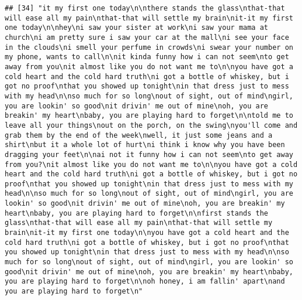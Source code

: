 \documentclass[]{article}
\begin{document}
\begin{verbatim}
## [34] "it my first one today\n\nthere stands the glass\nthat-that will ease all my pain\nthat-that will settle my brain\nit-it my first one today\n\nhey\ni saw your sister at work\ni saw your mama at church\ni am pretty sure i saw your car at the mall\ni see your face in the clouds\ni smell your perfume in crowds\ni swear your number on my phone, wants to call\n\nit kinda funny how i can not seem\nto get away from you\nit almost like you do not want me to\n\nyou have got a cold heart and the cold hard truth\ni got a bottle of whiskey, but i got no proof\nthat you showed up tonight\nin that dress just to mess with my head\n\nso much for so long\nout of sight, out of mind\ngirl, you are lookin' so good\nit drivin' me out of mine\noh, you are breakin' my heart\nbaby, you are playing hard to forget\n\ntold me to leave all your things\nout on the porch, on the swing\nyou'll come and grab them by the end of the week\nwell, it just some jeans and a shirt\nbut it a whole lot of hurt\ni think i know why you have been dragging your feet\n\nai not it funny how i can not seem\nto get away from you?\nit almost like you do not want me to\n\nyou have got a cold heart and the cold hard truth\ni got a bottle of whiskey, but i got no proof\nthat you showed up tonight\nin that dress just to mess with my head\n\nso much for so long\nout of sight, out of mind\ngirl, you are lookin' so good\nit drivin' me out of mine\noh, you are breakin' my heart\nbaby, you are playing hard to forget\n\nfirst stands the glass\nthat-that will ease all my pain\nthat-that will settle my brain\nit-it my first one today\n\nyou have got a cold heart and the cold hard truth\ni got a bottle of whiskey, but i got no proof\nthat you showed up tonight\nin that dress just to mess with my head\n\nso much for so long\nout of sight, out of mind\ngirl, you are lookin' so good\nit drivin' me out of mine\noh, you are breakin' my heart\nbaby, you are playing hard to forget\n\noh honey, i am fallin' apart\nand you are playing hard to forget\n"                                                                                                                                                                                                                                                                                                                                                                                                                                                                                                                                                                                                                                                                                                                                                                                                                                                                                    

\end{verbatim}
\end{document}
